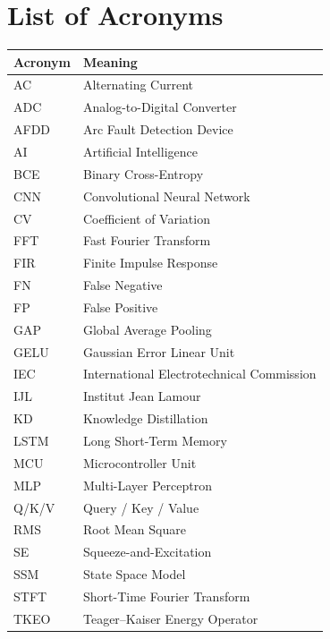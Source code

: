 \chapter*{List of Acronyms}

\vspace{0.5cm}

\begin{center}
\renewcommand{\arraystretch}{1.3}
\begin{tabular}{|p{3cm}|p{11cm}|}
\hline
\textbf{Acronym} & \textbf{Meaning} \\
\hline
AC      & Alternating Current \\
\hline
ADC     & Analog-to-Digital Converter \\
\hline
AFDD    & Arc Fault Detection Device \\
\hline
AI      & Artificial Intelligence \\
\hline
BCE     & Binary Cross-Entropy \\
\hline
CNN     & Convolutional Neural Network \\
\hline
CV      & Coefficient of Variation \\
\hline
FFT     & Fast Fourier Transform \\
\hline
FIR     & Finite Impulse Response \\
\hline
FN      & False Negative \\
\hline
FP      & False Positive \\
\hline
GAP     & Global Average Pooling \\
\hline
GELU    & Gaussian Error Linear Unit \\
\hline
IEC     & International Electrotechnical Commission \\
\hline
IJL     & Institut Jean Lamour \\
\hline
KD      & Knowledge Distillation \\
\hline
LSTM    & Long Short-Term Memory \\
\hline
MCU     & Microcontroller Unit \\
\hline
MLP     & Multi-Layer Perceptron \\
\hline
Q/K/V   & Query / Key / Value \\
\hline
RMS     & Root Mean Square \\
\hline
SE      & Squeeze-and-Excitation \\
\hline
SSM     & State Space Model \\
\hline
STFT    & Short-Time Fourier Transform \\
\hline
TKEO    & Teager--Kaiser Energy Operator \\
\hline
\end{tabular}
\end{center}
